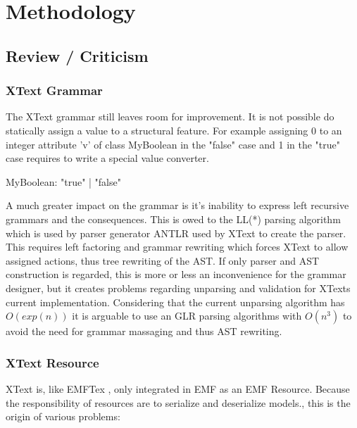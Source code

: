 \chapter{Methodology}

\section{Review / Criticism}
\subsection{XText Grammar}
The XText grammar still leaves room for improvement. It is not possible do statically assign a value  to a structural feature. For example assigning 0 to an integer attribute 'v' of class MyBoolean in the "false" case and 1 in the "true" case requires to write a special value converter. 
\begin{xtxt}
MyBoolean:  "true" | "false"
\end{xtxt}

A much greater impact on the grammar is it's inability to express left recursive grammars and the consequences. This is owed to the LL(*) parsing algorithm which is used by parser generator ANTLR used by XText to create the parser. This requires left factoring and grammar rewriting which forces XText to allow assigned actions, thus tree rewriting of the AST. If only parser and AST construction is regarded, this is more or less an inconvenience for the grammar designer, but it creates problems regarding unparsing and validation for XTexts current implementation. Considering that the current unparsing algorithm has $O(exp(n))$ it is arguable to use an GLR parsing algorithms with  $O(n^3)$ to avoid the need for grammar massaging and thus AST rewriting.

\subsection{XText Resource}
XText is, like EMFTex \cite{EMFTextMan}, only integrated in EMF as an EMF Resource. Because the responsibility of resources are to serialize and deserialize models., this is the origin of various problems: 

